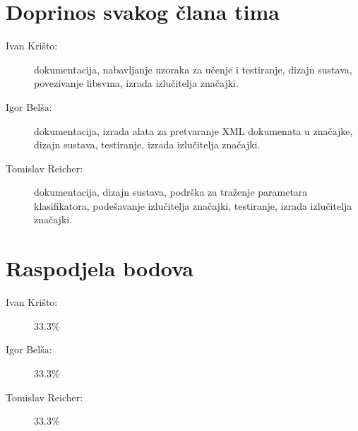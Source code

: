 \documentclass{article}
\begin{document}
\newpage

\section{Doprinos svakog člana tima}
\begin{description}
\item[Ivan Krišto:] dokumentacija, nabavljanje uzoraka za učenje i testiranje,
dizajn sustava, povezivanje libsvma, izrada izlučitelja značajki.
\item[Igor Belša:] dokumentacija, izrada alata za pretvaranje XML dokumenata u
značajke, dizajn sustava, testiranje, izrada izlučitelja značajki.
\item[Tomislav Reicher:] dokumentacija, dizajn sustava, podrška za traženje
parametara klasifikatora, podešavanje izlučitelja značajki, testiranje, izrada
izlučitelja značajki.
\end{description}

\section{Raspodjela bodova}
\begin{description}
\item[Ivan Krišto:] 33.3\%
\item[Igor Belša:] 33.3\%
\item[Tomislav Reicher:] 33.3\%
\end{description}
\end{document}
